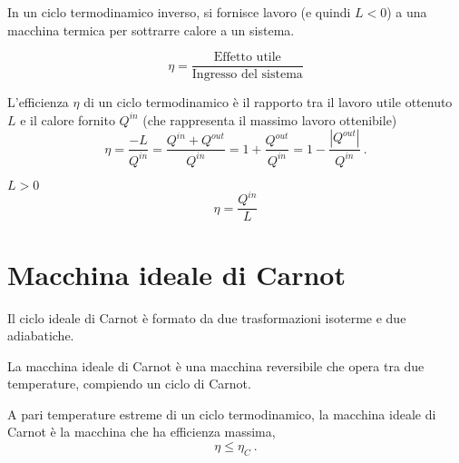 \begin{definition} In un ciclo termodinamico inverso, si fornisce lavoro (e quindi $L < 0$) a una macchina termica per sottrarre calore a un sistema.
\end{definition}
\begin{example}[Frigorifero]
\end{example}

\begin{definition}
    \begin{equation}
        \eta = \dfrac{\text{Effetto utile}}{\text{Ingresso del sistema}}
    \end{equation}
\end{definition}

\begin{definition} L'efficienza $\eta$ di un ciclo termodinamico è il rapporto tra il lavoro utile ottenuto $L$ e il calore fornito $Q^{in}$ (che rappresenta il massimo lavoro ottenibile)
    \begin{equation}
        \eta = \dfrac{-L}{Q^{in}} = \dfrac{Q^{in}+Q^{out}}{Q^{in}} = 1 + \dfrac{Q^{out}}{Q^{in}} =  1 - \dfrac{|Q^{out}|}{Q^{in}} \ .
    \end{equation}
\end{definition}

\begin{definition} $L > 0$
    \begin{equation}
        \eta = \dfrac{Q^{in}}{L}
    \end{equation}
\end{definition}

\section{Macchina ideale di Carnot}
\begin{definition}
    Il ciclo ideale di Carnot è formato da due trasformazioni isoterme e due adiabatiche.
\end{definition}
\begin{definition}
    La macchina ideale di Carnot è una macchina reversibile che opera tra due temperature, compiendo un ciclo di Carnot.
\end{definition}
\begin{definition}
    A pari temperature estreme di un ciclo termodinamico, la macchina ideale di Carnot è la macchina che ha efficienza massima,
    \begin{equation} \eta \le \eta_C \ . \end{equation}
\end{definition}

